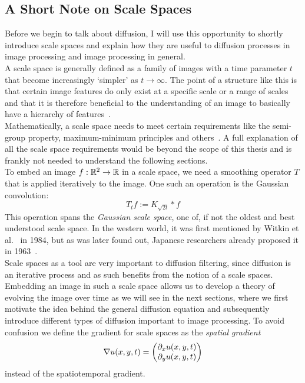 \subsection{A Short Note on Scale Spaces}\label{sub:ScaleSpaces}
Before we begin to talk about diffusion, I will use this opportunity to shortly introduce scale
spaces and explain how they are useful to diffusion processes in image processing and image
processing in general.\\
A scale space is generally defined as a family of images with a time parameter $t$ that become
increasingly `simpler' as $t \to \infty$. The point of a structure like this is that certain image
features do only exist at a specific scale or a range of scales and that it is therefore beneficial
to the understanding of an image to basically have a hierarchy of features~\cite{lindeberg94}.\\
Mathematically, a scale
space needs to meet certain requirements like the semi-group property, maximum-minimum principles
and others~\cite{weickert96, alvarez93}.\newpage\noindent
A full explanation of all the scale space requirements would be beyond the scope of this thesis
and is frankly not needed to understand the following sections.\\
To embed an image $f:\mathbb{R}^2 \rightarrow \mathbb{R}$ in a scale space, we need a smoothing
operator $T$ that is applied iteratively to the image. One such an operation is the Gaussian
convolution: 
\begin{equation}
    T_{t}f := K_{\sqrt{2t}} * f
\end{equation}
This operation spans the \textit{Gaussian scale space}, one of, if not the oldest and best
understood scale space. In the western world, it was first mentioned by Witkin et
al.~\cite{witkin84} in 1984, but as was later found out, Japanese researchers already proposed it in
1963~\cite{weickert-ishikawa}.\\
Scale spaces as a tool are very important to diffusion filtering, since diffusion is an iterative
process and as such benefits from the notion of a scale spaces. Embedding an image in such a scale
space allows us to develop a theory of evolving the image over time as we will see in the next
sections, where we first motivate the idea behind the general diffusion equation and
subsequently introduce different types of diffusion important to image processing.
To avoid confusion we define the gradient for scale spaces as the \textit{spatial gradient} 
\begin{equation}
    \mathbf{\nabla} u(x, y, t) = \begin{pmatrix}
        \partial_x u(x, y, t)\\
        \partial_y u(x, y, t)
    \end{pmatrix} 
\end{equation}
instead of the spatiotemporal gradient.

